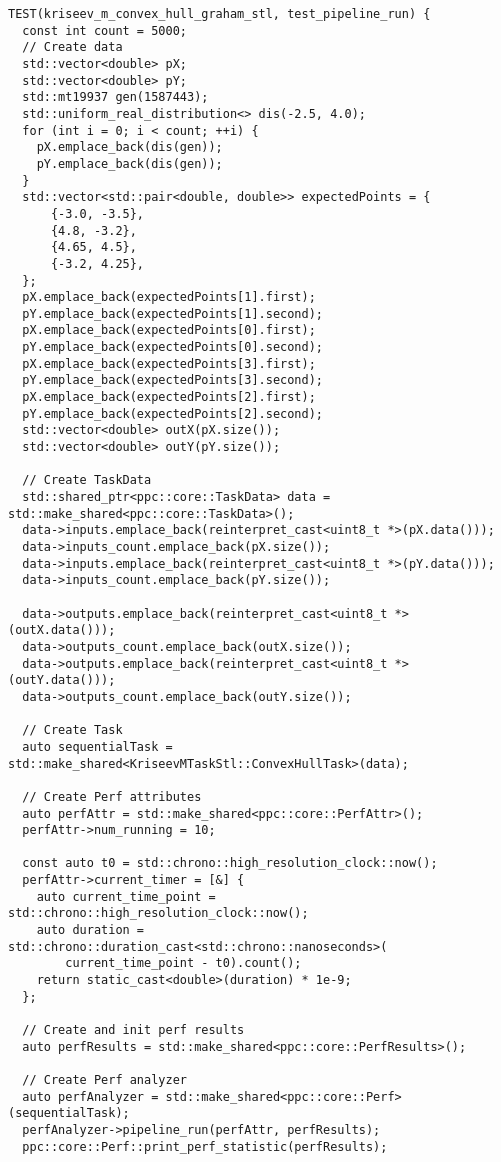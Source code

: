\documentclass[a4paper]{article}
\begin{document}
\begin{lstlisting}
TEST(kriseev_m_convex_hull_graham_stl, test_pipeline_run) {
  const int count = 5000;
  // Create data
  std::vector<double> pX;
  std::vector<double> pY;
  std::mt19937 gen(1587443);
  std::uniform_real_distribution<> dis(-2.5, 4.0);
  for (int i = 0; i < count; ++i) {
    pX.emplace_back(dis(gen));
    pY.emplace_back(dis(gen));
  }
  std::vector<std::pair<double, double>> expectedPoints = {
      {-3.0, -3.5},
      {4.8, -3.2},
      {4.65, 4.5},
      {-3.2, 4.25},
  };
  pX.emplace_back(expectedPoints[1].first);
  pY.emplace_back(expectedPoints[1].second);
  pX.emplace_back(expectedPoints[0].first);
  pY.emplace_back(expectedPoints[0].second);
  pX.emplace_back(expectedPoints[3].first);
  pY.emplace_back(expectedPoints[3].second);
  pX.emplace_back(expectedPoints[2].first);
  pY.emplace_back(expectedPoints[2].second);
  std::vector<double> outX(pX.size());
  std::vector<double> outY(pY.size());

  // Create TaskData
  std::shared_ptr<ppc::core::TaskData> data = std::make_shared<ppc::core::TaskData>();
  data->inputs.emplace_back(reinterpret_cast<uint8_t *>(pX.data()));
  data->inputs_count.emplace_back(pX.size());
  data->inputs.emplace_back(reinterpret_cast<uint8_t *>(pY.data()));
  data->inputs_count.emplace_back(pY.size());

  data->outputs.emplace_back(reinterpret_cast<uint8_t *>(outX.data()));
  data->outputs_count.emplace_back(outX.size());
  data->outputs.emplace_back(reinterpret_cast<uint8_t *>(outY.data()));
  data->outputs_count.emplace_back(outY.size());

  // Create Task
  auto sequentialTask = std::make_shared<KriseevMTaskStl::ConvexHullTask>(data);

  // Create Perf attributes
  auto perfAttr = std::make_shared<ppc::core::PerfAttr>();
  perfAttr->num_running = 10;

  const auto t0 = std::chrono::high_resolution_clock::now();
  perfAttr->current_timer = [&] {
    auto current_time_point = std::chrono::high_resolution_clock::now();
    auto duration = std::chrono::duration_cast<std::chrono::nanoseconds>(
        current_time_point - t0).count();
    return static_cast<double>(duration) * 1e-9;
  };

  // Create and init perf results
  auto perfResults = std::make_shared<ppc::core::PerfResults>();

  // Create Perf analyzer
  auto perfAnalyzer = std::make_shared<ppc::core::Perf>(sequentialTask);
  perfAnalyzer->pipeline_run(perfAttr, perfResults);
  ppc::core::Perf::print_perf_statistic(perfResults);


\end{lstlisting}
\end{document}
